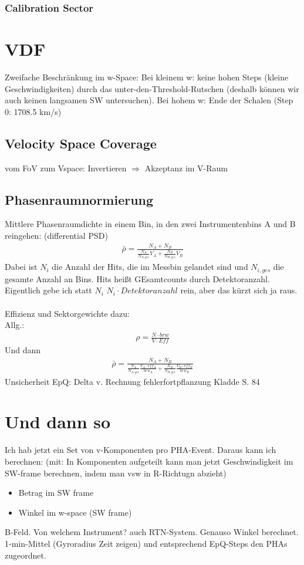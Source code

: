 \subsubsection{Calibration Sector}




%
%
%
\section{VDF}
Zweifache Beschränkung im w-Space: Bei kleinem w: keine hohen Steps (kleine Geschwindigkeiten) durch das unter-den-Threshold-Rutschen (deshalb können wir auch keinen langsamen SW untersuchen). Bei hohem w: Ende der Schalen (Step 0: 1708.5 km/s)
%
\subsection{Velocity Space Coverage}
vom FoV zum Vspace: Invertieren $\Rightarrow$ Akzeptanz im V-Raum

%
\subsection{Phasenraumnormierung}
Mittlere Phasenraumdichte in einem Bin, in den zwei Instrumentenbins A und B reingehen:
(differential PSD)
\begin{align}
\bar{\rho} = \frac{N_A + N_B}{\frac{N_A}{N_{A,ges}} V_A + \frac{N_B}{N_{B,ges}} V_B }
\end{align}
Dabei ist $N_i$ die Anzahl der Hits, die im Messbin gelandet sind und $N_{i,ges}$ die gesamte Anzahl an Bins. Hits heißt GEsamtcounts durch Detektoranzahl. Eigentlich gebe ich statt $N_i$ $N_i \cdot Detektoranzahl$ rein, aber das kürzt sich ja raus.\\ \\
Effizienz und Sektorgewichte dazu:\\
Allg.:
\begin{align*}
\rho = \frac{N \cdot brw}{V \cdot Eff}
\end{align*}
Und dann
\begin{align}
\bar{\rho} = \frac{N_A + N_B}{\frac{N_A}{N_{A,ges}} \frac{V_A \cdot eff_A}{brw_A} + \frac{N_B}{N_{B,ges}} \frac{V_B \cdot eff_B}{brw_B} }
\end{align}
Unsicherheit EpQ: Delta v. Rechnung fehlerfortpflanzung Kladde S. 84


%
%
%
\section{Und dann so}
Ich hab jetzt ein Set von v-Komponenten pro PHA-Event. Daraus kann ich berechnen:
(mit: In Komponenten aufgeteilt kann man jetzt Geschwindigkeit im SW-frame berechnen, indem man vsw in R-Richtugn abzieht)
\begin{itemize}
	\item Betrag im SW frame
	\item Winkel im w-space (SW frame)
\end{itemize}
B-Feld. Von welchem Instrument? auch RTN-System. Genauso Winkel berechnet.\\
1-min-Mittel (Gyroradius Zeit zeigen) und entsprechend EpQ-Steps den PHAs zugeordnet.


